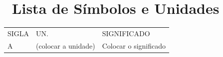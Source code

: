 \chapter*{\hspace*{3pt}~Lista de Símbolos e Unidades}
\begin{tabular}{ p{5cm}  p{5cm}  p{10cm} }

SIGLA & UN. & SIGNIFICADO \\

A & (colocar a unidade) & Colocar o significado \\

\end{tabular}
\newpage